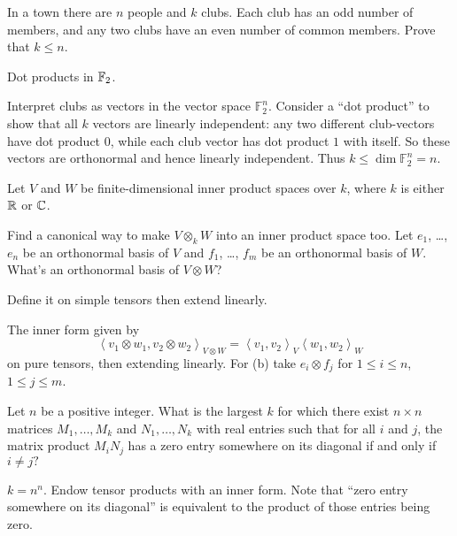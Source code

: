 \begin{problem}
	\gim
	In a town there are $n$ people and $k$ clubs.
	Each club has an odd number of members,
	and any two clubs have an even number of common members.
	Prove that $k \le n$.
	\begin{hint}
		Dot products in $\mathbb F_2$.
	\end{hint}
	\begin{sol}
		Interpret clubs as vectors in the vector space $\mathbb F_2^n$.
		Consider a ``dot product''
		to show that all $k$ vectors are linearly independent:
		any two different club-vectors have dot product $0$,
		while each club vector has dot product $1$ with itself.
		So these vectors are orthonormal and hence linearly independent.
		Thus $k \le \dim \mathbb F_2^n = n$.
	\end{sol}
\end{problem}

\begin{sproblem}
	\label{prob:inner_prod_tensor}
	Let $V$ and $W$ be finite-dimensional inner product spaces over $k$,
	where $k$ is either $\mathbb R$ or $\mathbb C$.
	\begin{enumerate}[(a)]
		\ii Find a canonical way to make $V \otimes_k W$ into an inner product space too.
		\ii Let $e_1$, \dots, $e_n$ be an orthonormal basis of $V$
		and $f_1$, \dots, $f_m$ be an orthonormal basis of $W$.
		What's an orthonormal basis of $V \otimes W$?
	\end{enumerate}
	\begin{hint}
		Define it on simple tensors then extend linearly.
	\end{hint}
	\begin{sol}
		The inner form given by
		\[ \left< v_1 \otimes w_1 , v_2 \otimes w_2 \right>_{V \otimes W}
		= \left< v_1,v_2 \right>_V \left< w_1,w_2\right>_W \]
		on pure tensors, then extending linearly.
		For (b) take $e_i \otimes f_j$ for $1 \le i \le n$, $1 \le j \le m$.
	\end{sol}
\end{sproblem}

\begin{problem}[Putnam 2014]
	\gim
	Let $n$ be a positive integer.
	What is the largest $k$ for which there exist
	$n\times n$ matrices $M_1,\dots,M_k$ and $N_1,\dots,N_k$
	with real entries such that for all $i$ and $j$,
	the matrix product $M_i N_j$ has a zero entry somewhere
	on its diagonal if and only if $i \neq j?$
	\begin{hint}
		$k = n^n$.
		Endow tensor products with an inner form.
		Note that ``zero entry somewhere on its diagonal''
		is equivalent to the product of those entries being zero.
	\end{hint}
\end{problem}

